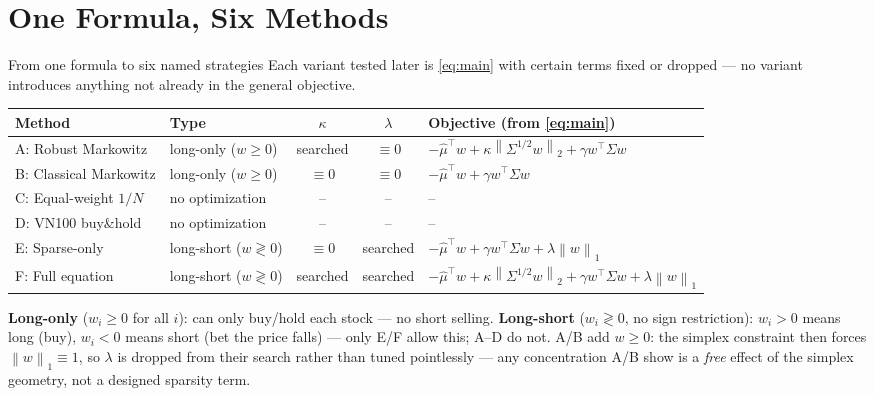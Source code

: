 \documentclass[aspectratio=169]{beamer}
\newcommand{\muhat}{\hat{\mu}}
\newcommand{\Sig}{\Sigma}
\newcommand{\Ssqrt}{\Sigma^{1/2}}
\newcommand{\norm}[1]{\left\lVert #1 \right\rVert}
\begin{document}
\section{One Formula, Six Methods}

\begin{frame}{From one formula to six named strategies}
  \footnotesize
  Each variant tested later is \cref{eq:main} with certain terms fixed or dropped --- no
  variant introduces anything not already in the general objective.
  \vspace{0.15cm}
  \begin{table}
  \centering
  \tiny
  \begin{tabular}{@{}llccl@{}}
  \toprule
  \textbf{Method} & \textbf{Type} & $\kappa$ & $\lambda$ & \textbf{Objective (from \cref{eq:main})} \\
  \midrule
  A: Robust Markowitz    & long-only ($w\ge0$)       & searched  & $\equiv0$ &
    $-\muhat^\top w+\kappa\norm{\Ssqrt w}_2+\gamma w^\top\Sig w$ \\
  B: Classical Markowitz & long-only ($w\ge0$)       & $\equiv0$ & $\equiv0$ &
    $-\muhat^\top w+\gamma w^\top\Sig w$ \\
  C: Equal-weight $1/N$  & no optimization           & --        & --        & -- \\
  D: VN100 buy\&hold     & no optimization           & --        & --        & -- \\
  E: Sparse-only         & long-short ($w\gtrless0$) & $\equiv0$ & searched  &
    $-\muhat^\top w+\gamma w^\top\Sig w+\lambda\norm{w}_1$ \\
  F: Full equation       & long-short ($w\gtrless0$) & searched  & searched  &
    $-\muhat^\top w+\kappa\norm{\Ssqrt w}_2+\gamma w^\top\Sig w+\lambda\norm{w}_1$ \\
  \bottomrule
  \end{tabular}
  \end{table}
  \vspace{0.15cm}
  \footnotesize
  \textbf{Long-only} ($w_i\ge0$ for all $i$): can only buy/hold each stock --- no short selling.
  \textbf{Long-short} ($w_i\gtrless0$, no sign restriction): $w_i>0$ means long (buy), $w_i<0$
  means short (bet the price falls) --- only E/F allow this; A--D do not.
  \vspace{0.1cm}
  A/B add $w\ge0$: the simplex constraint then forces $\norm{w}_1\equiv1$, so $\lambda$ is
  dropped from their search rather than tuned pointlessly --- any concentration A/B show is a
  \emph{free} effect of the simplex geometry, not a designed sparsity term.
\end{frame}
\end{document}
